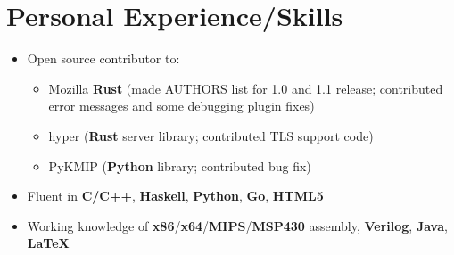 \documentclass{my_resume}
\begin{document}
\section{Personal Experience/Skills}
\begin{itemize}
	\item Open source contributor to:
	\begin{itemize}
		\item Mozilla \textbf{Rust} (made AUTHORS list for 1.0 and 1.1 release;
			contributed error messages and some debugging plugin fixes)
		\item hyper (\textbf{Rust} server library; contributed TLS support code)
		\item PyKMIP (\textbf{Python} library; contributed bug fix)
	\end{itemize}
	\item Fluent in \textbf{C/C++}, \textbf{Haskell}, \textbf{Python},
		\textbf{Go}, \textbf{HTML5}
	\item Working knowledge of \textbf{x86}/\textbf{x64}/\textbf{MIPS}/\textbf{MSP430} assembly,
		\textbf{Verilog}, \textbf{Java}, \textbf{LaTeX}
\end{itemize}
\end{document}
